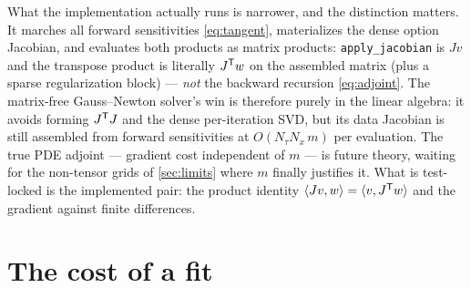 \documentclass[11pt]{article}
\begin{document}
What the implementation actually runs is narrower, and the distinction
matters.  It marches all forward sensitivities \eqref{eq:tangent},
materializes the dense option Jacobian, and evaluates both products as
matrix products: \texttt{apply\_jacobian} is $Jv$ and the transpose product
is literally $J^{\mathsf{T}} w$ on the assembled matrix (plus a sparse regularization
block) --- \emph{not} the backward recursion \eqref{eq:adjoint}.  The
matrix-free Gauss--Newton solver's win is therefore purely in the linear
algebra: it avoids forming $J^{\mathsf{T}} J$ and the dense per-iteration SVD, but its
data Jacobian is still assembled from forward sensitivities at
$O(N_\tau N_x\,m)$ per evaluation.  The true PDE adjoint --- gradient cost
independent of $m$ --- is future theory, waiting for the non-tensor grids
of \cref{sec:limits} where $m$ finally justifies it.  What is test-locked
is the implemented pair: the product identity
$\langle Jv,w\rangle=\langle v,J^{\mathsf{T}} w\rangle$ and the gradient against finite
differences.

\section{The cost of a fit}
\label{sec:solvers}
\end{document}
